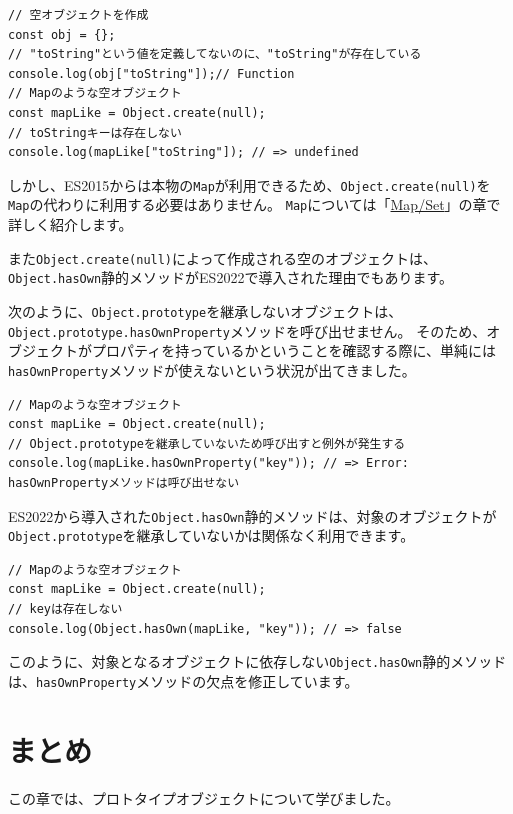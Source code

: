 \begin{lstlisting}
// 空オブジェクトを作成
const obj = {};
// "toString"という値を定義してないのに、"toString"が存在している
console.log(obj["toString"]);// Function
// Mapのような空オブジェクト
const mapLike = Object.create(null);
// toStringキーは存在しない
console.log(mapLike["toString"]); // => undefined
\end{lstlisting}

しかし、ES2015からは本物の\texttt{Map}が利用できるため、\texttt{Object.create(null)}を\texttt{Map}の代わりに利用する必要はありません。
\texttt{Map}については「\hyperlink{map-and-set}{Map/Set}」の章で詳しく紹介します。

また\texttt{Object.create(null)}によって作成される空のオブジェクトは、\texttt{Object.hasOwn}静的メソッドがES2022で導入された理由でもあります。

次のように、\texttt{Object.prototype}を継承しないオブジェクトは、\texttt{Object.prototype.hasOwnProperty}メソッドを呼び出せません。
そのため、オブジェクトがプロパティを持っているかということを確認する際に、単純には\texttt{hasOwnProperty}メソッドが使えないという状況が出てきました。

\begin{lstlisting}
// Mapのような空オブジェクト
const mapLike = Object.create(null);
// Object.prototypeを継承していないため呼び出すと例外が発生する
console.log(mapLike.hasOwnProperty("key")); // => Error: hasOwnPropertyメソッドは呼び出せない
\end{lstlisting}

ES2022から導入された\texttt{Object.hasOwn}静的メソッドは、対象のオブジェクトが\texttt{Object.prototype}を継承していないかは関係なく利用できます。

\begin{lstlisting}
// Mapのような空オブジェクト
const mapLike = Object.create(null);
// keyは存在しない
console.log(Object.hasOwn(mapLike, "key")); // => false
\end{lstlisting}

このように、対象となるオブジェクトに依存しない\texttt{Object.hasOwn}静的メソッドは、\texttt{hasOwnProperty}メソッドの欠点を修正しています。

\hypertarget{conclusion}{%
\section{まとめ}\label{conclusion}}

この章では、プロトタイプオブジェクトについて学びました。

